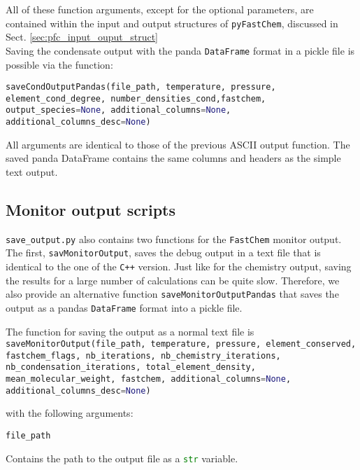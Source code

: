 \documentclass[numbers=noenddot]{aux/fcmanual}
\newcommand{\fc}{\texttt{FastChem}\xspace}
\newcommand{\pfc}{\texttt{pyFastChem}\xspace}
\newcommand{\cpp}{\ttt{C++}\xspace}
\newcommand{\ttt}[1]{\texttt {#1}}
\begin{document}
\bigbreak

All of these function arguments, except for the optional parameters, are contained within the input and output structures of \pfc, discussed in Sect. \ref{sec:pfc_input_ouput_struct}\\

Saving the condensate output with the panda \lstinline[language=Python]!DataFrame! format in a pickle file is possible via the function:

\bigbreak

\lstinline[language=Python, breaklines, breakatwhitespace]!saveCondOutputPandas(file_path, temperature, pressure, element_cond_degree, number_densities_cond,fastchem, output_species=None, additional_columns=None, additional_columns_desc=None)!

\bigbreak

All arguments are identical to those of the previous ASCII output function. The saved panda DataFrame contains the same columns and headers as the simple text output.


\subsection{Monitor output scripts}

\texttt{save\_output.py} also contains two functions for the \fc monitor output. The first, \lstinline[language=Python]!savMonitorOutput!, saves the debug output in a text file that is identical to the one of the \cpp version. Just like for the chemistry output, saving the results for a large number of calculations can be quite slow. Therefore, we also provide an alternative function \lstinline[language=Python]!saveMonitorOutputPandas! that saves the output as a pandas \lstinline[language=Python]!DataFrame! format into a pickle file. 

The function for saving the output as a normal text file is\\

\lstinline[language=Python, breaklines, breakatwhitespace]!saveMonitorOutput(file_path, temperature, pressure, element_conserved, fastchem_flags, nb_iterations, nb_chemistry_iterations, nb_condensation_iterations, total_element_density, mean_molecular_weight, fastchem, additional_columns=None, additional_columns_desc=None)!

\bigbreak

with the following arguments:

\bigbreak

\lstinline[language=Python]!file_path!
\begin{addmargin}[25pt]{0pt}
	Contains the path to the output file as a \lstinline[language=Python]!str! variable.
\end{addmargin}
\end{document}
